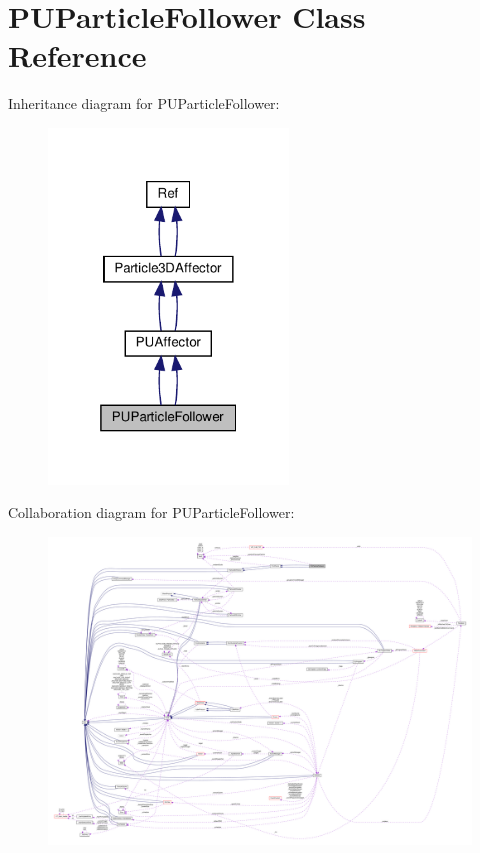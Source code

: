 \hypertarget{classPUParticleFollower}{}\section{P\+U\+Particle\+Follower Class Reference}
\label{classPUParticleFollower}


Inheritance diagram for P\+U\+Particle\+Follower\+:
\nopagebreak
\begin{figure}[H]
\begin{center}
\leavevmode
\includegraphics[width=181pt]{classPUParticleFollower__inherit__graph}
\end{center}
\end{figure}


Collaboration diagram for P\+U\+Particle\+Follower\+:
\nopagebreak
\begin{figure}[H]
\begin{center}
\leavevmode
\includegraphics[width=350pt]{classPUParticleFollower__coll__graph}
\end{center}
\end{figure}
